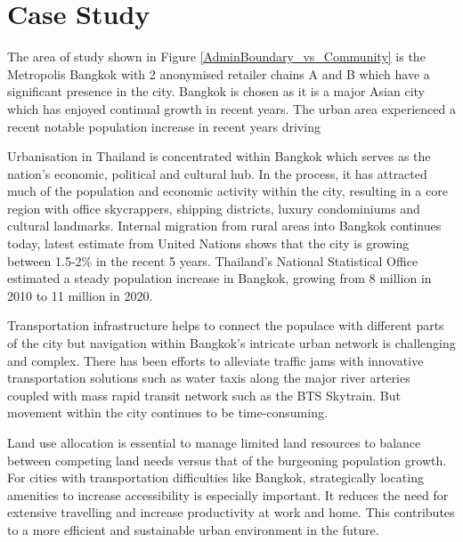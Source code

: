 \documentclass{ecai}
\begin{document}
\section{Case Study}


The area of study shown in Figure \ref{AdminBoundary_vs_Community} is the Metropolis Bangkok with 2 anonymised retailer chains A and B which have a significant presence in the city. Bangkok is chosen as it is a major Asian city which has enjoyed continual growth in recent years. The urban area experienced a recent notable population increase in recent years driving  

Urbanisation in Thailand is concentrated within Bangkok which serves as the nation's economic, political and cultural hub. In the process, it has attracted much of the population and economic activity within the city, resulting in a core region with office skycrappers, shipping districts, luxury condominiums and cultural landmarks. Internal migration from rural areas into Bangkok continues today, latest estimate from United Nations shows that the city is growing between 1.5-2\% in the recent 5 years. Thailand's National Statistical Office estimated a steady population increase in Bangkok, growing from 8 million in 2010 to 11 million in 2020.

Transportation infrastructure helps to connect the populace with different parts of the city but navigation within Bangkok's intricate urban network is challenging and complex.  There has been efforts to alleviate traffic jams with innovative transportation solutions such as water taxis along the major river arteries coupled with mass rapid transit network such as the BTS Skytrain. But movement within the city continues to be time-consuming. 

Land use allocation is essential to manage limited land resources to balance between competing land needs versus that of the burgeoning population growth. For cities with transportation difficulties like Bangkok, strategically locating amenities to increase accessibility is especially important. It reduces the need for extensive travelling and increase productivity at work and home. This contributes to a more efficient and sustainable urban environment in the future.
\end{document}
